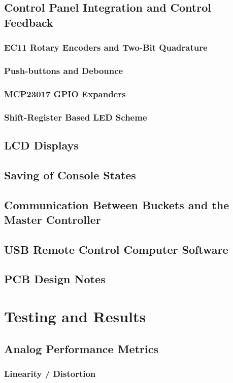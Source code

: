 \documentclass[11pt, letterpaper,titlepage]{article}
\begin{document}
\subsection{Control Panel Integration and Control Feedback}
\subsubsection{EC11 Rotary Encoders and Two-Bit Quadrature}
\subsubsection{Push-buttons and Debounce}
\subsubsection{MCP23017 GPIO Expanders}
\subsubsection{Shift-Register Based LED Scheme}
\subsection{LCD Displays}


\subsection{Saving of Console States}
\subsection{Communication Between Buckets and the Master Controller}
\subsection{USB Remote Control Computer Software}
\subsection{PCB Design Notes}

\newpage
\section{Testing and Results}
\subsection{Analog Performance Metrics}
\subsubsection{Linearity / Distortion}
\end{document}

